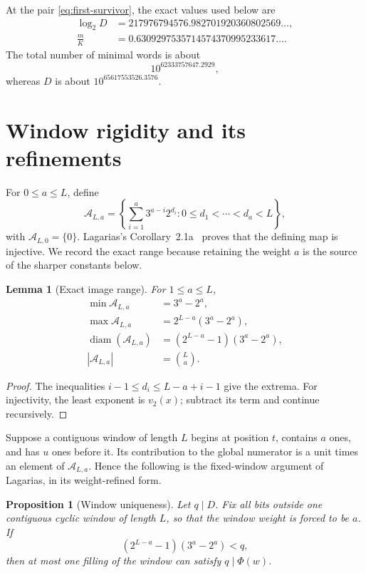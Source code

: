 \documentclass[11pt]{amsart}
\numberwithin{equation}{section}
\newtheorem{proposition}[theorem]{Proposition}
\newtheorem{lemma}[theorem]{Lemma}
\newcommand{\A}{\mathcal A}
\begin{document}
At the pair \eqref{eq:first-survivor}, the exact values used below are
\begin{align}
\log_2D&=217976794576.982701920360802569\ldots,\label{eq:logD-first}\\
\frac{m}{K}&=0.6309297535714574370995233617\ldots.\label{eq:alpha-first}
\end{align}
The total number of minimal words is about
\[
10^{62333757647.2929},
\]
whereas $D$ is about $10^{65617553526.3576}$.

\section{Window rigidity and its refinements}\label{sec:windows}

For $0\le a\le L$, define
\begin{equation}\label{eq:A-def}
\A_{L,a}=
\left\{
\sum_{i=1}^a3^{a-i}2^{d_i}:
0\le d_1<\cdots<d_a<L
\right\},
\end{equation}
with $\A_{L,0}=\{0\}$.  Lagarias's Corollary~2.1a~\cite{Lagarias1990} proves that the defining map is injective.  We record the exact range because retaining the weight $a$ is the source of the sharper constants below.

\begin{lemma}[Exact image range]\label{lem:A-range}
For $1\le a\le L$,
\begin{align}
\min\A_{L,a}&=3^a-2^a,\label{eq:A-min}\\
\max\A_{L,a}&=2^{L-a}(3^a-2^a),\label{eq:A-max}\\
\operatorname{diam}(\A_{L,a})&=(2^{L-a}-1)(3^a-2^a),\label{eq:A-diam}\\
|\A_{L,a}|&=\binom La.\label{eq:A-card}
\end{align}
\end{lemma}

\begin{proof}
The inequalities $i-1\le d_i\le L-a+i-1$ give the extrema.  For injectivity, the least exponent is $v_2(x)$; subtract its term and continue recursively.
\end{proof}

Suppose a contiguous window of length $L$ begins at position $t$, contains $a$ ones, and has $u$ ones before it.  Its contribution to the global numerator is a unit times an element of $\A_{L,a}$.  Hence the following is the fixed-window argument of Lagarias, in its weight-refined form.

\begin{proposition}[Window uniqueness]\label{prop:window-uniqueness}
Let $q\mid D$.  Fix all bits outside one contiguous cyclic window of length $L$, so that the window weight is forced to be $a$.  If
\begin{equation}\label{eq:window-rigid}
(2^{L-a}-1)(3^a-2^a)<q,
\end{equation}
then at most one filling of the window can satisfy $q\mid\Phi(w)$.
\end{proposition}
\end{document}
